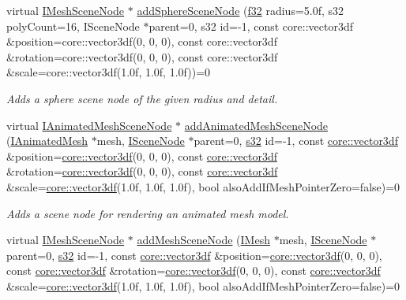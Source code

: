 \begin{DoxyCompactItemize}
virtual \hyperlink{classirr_1_1scene_1_1IMeshSceneNode}{I\+Mesh\+Scene\+Node} $\ast$ \hyperlink{classirr_1_1scene_1_1ISceneManager_acd6454347276ff8c74e46063970cfc04}{add\+Sphere\+Scene\+Node} (\hyperlink{namespaceirr_a0277be98d67dc26ff93b1a6a1d086b07}{f32} radius=5.\+0f, s32 poly\+Count=16, I\+Scene\+Node $\ast$parent=0, s32 id=-\/1, const core\+::vector3df \&position=core\+::vector3df(0, 0, 0), const core\+::vector3df \&rotation=core\+::vector3df(0, 0, 0), const core\+::vector3df \&scale=core\+::vector3df(1.\+0f, 1.\+0f, 1.\+0f))=0
\begin{DoxyCompactList}\small\item\em Adds a sphere scene node of the given radius and detail. \end{DoxyCompactList}\item 
virtual \hyperlink{classirr_1_1scene_1_1IAnimatedMeshSceneNode}{I\+Animated\+Mesh\+Scene\+Node} $\ast$ \hyperlink{classirr_1_1scene_1_1ISceneManager_a8e2e0cd3a27e85b4116855dd2f3365b8}{add\+Animated\+Mesh\+Scene\+Node} (\hyperlink{classirr_1_1scene_1_1IAnimatedMesh}{I\+Animated\+Mesh} $\ast$mesh, \hyperlink{classirr_1_1scene_1_1ISceneNode}{I\+Scene\+Node} $\ast$parent=0, \hyperlink{namespaceirr_ac66849b7a6ed16e30ebede579f9b47c6}{s32} id=-\/1, const \hyperlink{namespaceirr_1_1core_ae6e2b2a6c552833ebbd5b7463d03586b}{core\+::vector3df} \&position=\hyperlink{namespaceirr_1_1core_ae6e2b2a6c552833ebbd5b7463d03586b}{core\+::vector3df}(0, 0, 0), const \hyperlink{namespaceirr_1_1core_ae6e2b2a6c552833ebbd5b7463d03586b}{core\+::vector3df} \&rotation=\hyperlink{namespaceirr_1_1core_ae6e2b2a6c552833ebbd5b7463d03586b}{core\+::vector3df}(0, 0, 0), const \hyperlink{namespaceirr_1_1core_ae6e2b2a6c552833ebbd5b7463d03586b}{core\+::vector3df} \&scale=\hyperlink{namespaceirr_1_1core_ae6e2b2a6c552833ebbd5b7463d03586b}{core\+::vector3df}(1.\+0f, 1.\+0f, 1.\+0f), bool also\+Add\+If\+Mesh\+Pointer\+Zero=false)=0
\begin{DoxyCompactList}\small\item\em Adds a scene node for rendering an animated mesh model. \end{DoxyCompactList}\item 
virtual \hyperlink{classirr_1_1scene_1_1IMeshSceneNode}{I\+Mesh\+Scene\+Node} $\ast$ \hyperlink{classirr_1_1scene_1_1ISceneManager_aa0a32f9f5b13d94e24eed80bdb999919}{add\+Mesh\+Scene\+Node} (\hyperlink{classirr_1_1scene_1_1IMesh}{I\+Mesh} $\ast$mesh, \hyperlink{classirr_1_1scene_1_1ISceneNode}{I\+Scene\+Node} $\ast$parent=0, \hyperlink{namespaceirr_ac66849b7a6ed16e30ebede579f9b47c6}{s32} id=-\/1, const \hyperlink{namespaceirr_1_1core_ae6e2b2a6c552833ebbd5b7463d03586b}{core\+::vector3df} \&position=\hyperlink{namespaceirr_1_1core_ae6e2b2a6c552833ebbd5b7463d03586b}{core\+::vector3df}(0, 0, 0), const \hyperlink{namespaceirr_1_1core_ae6e2b2a6c552833ebbd5b7463d03586b}{core\+::vector3df} \&rotation=\hyperlink{namespaceirr_1_1core_ae6e2b2a6c552833ebbd5b7463d03586b}{core\+::vector3df}(0, 0, 0), const \hyperlink{namespaceirr_1_1core_ae6e2b2a6c552833ebbd5b7463d03586b}{core\+::vector3df} \&scale=\hyperlink{namespaceirr_1_1core_ae6e2b2a6c552833ebbd5b7463d03586b}{core\+::vector3df}(1.\+0f, 1.\+0f, 1.\+0f), bool also\+Add\+If\+Mesh\+Pointer\+Zero=false)=0

\end{DoxyCompactItemize}
